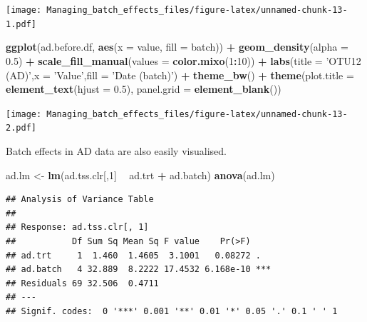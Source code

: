 \documentclass[]{book}
\newenvironment{Shaded}{\begin{snugshade}}{\end{snugshade}}
\newcommand{\KeywordTok}[1]{\textcolor[rgb]{0.13,0.29,0.53}{\textbf{#1}}}
\newcommand{\DataTypeTok}[1]{\textcolor[rgb]{0.13,0.29,0.53}{#1}}
\newcommand{\DecValTok}[1]{\textcolor[rgb]{0.00,0.00,0.81}{#1}}
\newcommand{\FloatTok}[1]{\textcolor[rgb]{0.00,0.00,0.81}{#1}}
\newcommand{\StringTok}[1]{\textcolor[rgb]{0.31,0.60,0.02}{#1}}
\newcommand{\OperatorTok}[1]{\textcolor[rgb]{0.81,0.36,0.00}{\textbf{#1}}}
\newcommand{\NormalTok}[1]{#1}
\begin{document}
\texttt{[image: Managing\_batch\_effects\_files/figure-latex/unnamed-chunk-13-1.pdf]}

\begin{Shaded}
\begin{Highlighting}[]
\KeywordTok{ggplot}\NormalTok{(ad.before.df, }\KeywordTok{aes}\NormalTok{(}\DataTypeTok{x =}\NormalTok{ value, }\DataTypeTok{fill =}\NormalTok{ batch)) }\OperatorTok{+}\StringTok{ }
\StringTok{  }\KeywordTok{geom_density}\NormalTok{(}\DataTypeTok{alpha =} \FloatTok{0.5}\NormalTok{) }\OperatorTok{+}\StringTok{ }\KeywordTok{scale_fill_manual}\NormalTok{(}\DataTypeTok{values =} \KeywordTok{color.mixo}\NormalTok{(}\DecValTok{1}\OperatorTok{:}\DecValTok{10}\NormalTok{)) }\OperatorTok{+}\StringTok{ }
\StringTok{  }\KeywordTok{labs}\NormalTok{(}\DataTypeTok{title =} \StringTok{'OTU12 (AD)'}\NormalTok{,}\DataTypeTok{x =} \StringTok{'Value'}\NormalTok{,}\DataTypeTok{fill =} \StringTok{'Date (batch)'}\NormalTok{) }\OperatorTok{+}\StringTok{ }
\StringTok{  }\KeywordTok{theme_bw}\NormalTok{() }\OperatorTok{+}\StringTok{ }\KeywordTok{theme}\NormalTok{(}\DataTypeTok{plot.title =} \KeywordTok{element_text}\NormalTok{(}\DataTypeTok{hjust =} \FloatTok{0.5}\NormalTok{), }
                     \DataTypeTok{panel.grid =} \KeywordTok{element_blank}\NormalTok{())}
\end{Highlighting}
\end{Shaded}

\texttt{[image: Managing\_batch\_effects\_files/figure-latex/unnamed-chunk-13-2.pdf]}

Batch effects in AD data are also easily visualised.

\begin{Shaded}
\begin{Highlighting}[]
\NormalTok{ad.lm <-}\StringTok{ }\KeywordTok{lm}\NormalTok{(ad.tss.clr[,}\DecValTok{1}\NormalTok{] }\OperatorTok{~}\StringTok{ }\NormalTok{ad.trt }\OperatorTok{+}\StringTok{ }\NormalTok{ad.batch)}
\KeywordTok{anova}\NormalTok{(ad.lm)}
\end{Highlighting}
\end{Shaded}

\begin{verbatim}
## Analysis of Variance Table
## 
## Response: ad.tss.clr[, 1]
##           Df Sum Sq Mean Sq F value    Pr(>F)    
## ad.trt     1  1.460  1.4605  3.1001   0.08272 .  
## ad.batch   4 32.889  8.2222 17.4532 6.168e-10 ***
## Residuals 69 32.506  0.4711                      
## ---
## Signif. codes:  0 '***' 0.001 '**' 0.01 '*' 0.05 '.' 0.1 ' ' 1
\end{verbatim}
\end{document}
